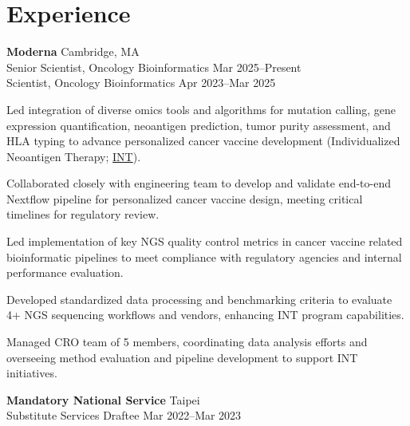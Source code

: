 \section{Experience}

\begin{entrylist}

\item \textbf{Moderna} \hfill Cambridge, MA\\
    Senior Scientist, Oncology Bioinformatics \hfill Mar 2025--Present\\
    Scientist, Oncology Bioinformatics \hfill Apr 2023--Mar 2025

\begin{detaillist}
    \item Led integration of diverse omics tools and algorithms for mutation calling, gene expression quantification, neoantigen prediction, tumor purity assessment, and HLA typing to advance personalized cancer vaccine development (Individualized Neoantigen Therapy; \href{https://en.wikipedia.org/wiki/MRNA-4157/V940}{INT}).
    \item Collaborated closely with engineering team to develop and validate end-to-end Nextflow pipeline for personalized cancer vaccine design, meeting critical timelines for regulatory review.
    \item Led implementation of key NGS quality control metrics in cancer vaccine related bioinformatic pipelines to meet compliance with regulatory agencies and internal performance evaluation.
    \item Developed standardized data processing and benchmarking criteria to evaluate 4+ NGS sequencing workflows and vendors, enhancing INT program capabilities.
    \item Managed CRO team of 5 members, coordinating data analysis efforts and overseeing method evaluation and pipeline development to support INT initiatives.
\end{detaillist}

\item \textbf{Mandatory National Service} \hfill Taipei\\
Substitute Services Draftee \hfill
Mar 2022--Mar 2023


\end{entrylist}
